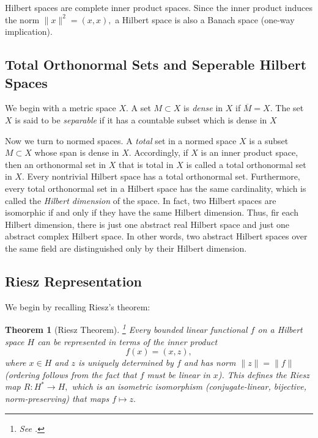 \documentclass[12pt,a4paper]{article}
\theoremstyle{boldthm}
\newtheorem{theorem}{Theorem}[section]
\theoremstyle{bolddefn}
\begin{document}
Hilbert spaces are complete inner product spaces. Since the inner product induces the norm $\|x\|^2 = (x, x),$ a Hilbert space is also a Banach space (one-way implication). 

\subsection{Total Orthonormal Sets and Seperable Hilbert Spaces \cite[Section 3.6]{krey}}

We begin with a metric space $X.$ A set $M \subset X$ is \textit{dense} in $X$ if $\overline M = X.$ The set $X$ is said to be \textit{separable} if it has a countable subset which is dense in $X$

Now we turn to normed spaces. A \textit{total} set in a normed space $X$ is a subset $M \subset X$ whose span is dense in $X.$ Accordingly, if $X$ is an inner product space, then an orthonormal set in $X$ that is total in $X$ is called a total orthonormal set in $X.$ Every nontrivial Hilbert space has a total orthonormal set. Furthermore, every total orthonormal set in a Hilbert space has the same cardinality, which is called the \textit{Hilbert dimension} of the space. In fact, two Hilbert spaces are isomorphic if and only if they have the same Hilbert dimension. Thus, fir each Hilbert dimension, there is just one abstract real Hilbert space and just one abstract complex Hilbert space. In other words, two abstract Hilbert spaces over the same field are distinguished only by their Hilbert dimension. 

\subsection{Riesz Representation \cite[Section 3.8]{krey} \cite[Section 2.4]{PatrickNote}}\label{Riesz}

We begin by recalling Riesz's theorem:

\begin{theorem}[Riesz Theorem]\footnote{See \cite[3.8-1]{krey}.}
    Every bounded linear functional $f$ on a Hilbert space $H$ can be represented in terms of the inner product
    \begin{equation}
    f(x) = (x, z),
\end{equation}
where $x \in H$ and $z$ is uniquely determined by $f$ and has norm $\|z\| = \|f\|$ (ordering follows from the fact that $f$ must be linear in $x$). This defines the \textit{Riesz map} $R : H^* \rightarrow H,$ which is an isometric isomorphism (conjugate-linear, bijective, norm-preserving) that maps $f \mapsto z.$ 
\end{theorem}
\end{document}
